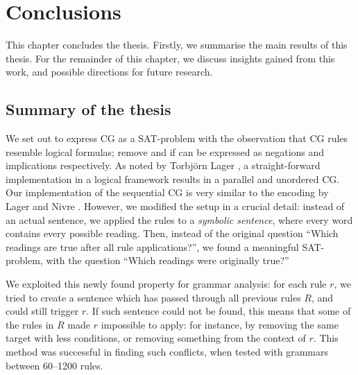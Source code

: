 \chapter{Conclusions}
\label{chapterConclusions}


This chapter concludes the thesis.
Firstly, we summarise the main results of this thesis.
For the remainder of this chapter, we discuss insights gained from this work, and possible directions for future research.

\section{Summary of the thesis}

We set out to express CG as a SAT-problem with the observation that CG rules resemble logical formulas; {\sc remove} and {\sc if} can be expressed as negations and implications respectively. As noted by Torbjörn Lager \cite{lager98}, 
a straight-forward implementation in a logical framework results in a parallel and unordered CG.
Our implementation of the sequential CG is very similar to the encoding by Lager and Nivre \cite{lager_nivre01}.
However, we modified the setup in a crucial detail: instead of an actual sentence, 
we applied the rules to a {\em symbolic sentence}, where every word contains every possible reading.
Then, instead of the original question ``Which readings are true after all rule applications?'', 
we found a meaningful SAT-problem, with the question ``Which readings were originally true?''

We exploited this newly found property for grammar analysis: 
for each rule $r$, we tried to create a sentence 
which has passed through all previous rules $R$, and could still trigger $r$.
If such sentence could not be found, this means that some of the rules in $R$ made $r$ impossible to apply: for instance, by removing the same target with less conditions, or removing something from the context of $r$.
This method was successful in finding such conflicts, when tested with grammars between 60--1200 rules.



